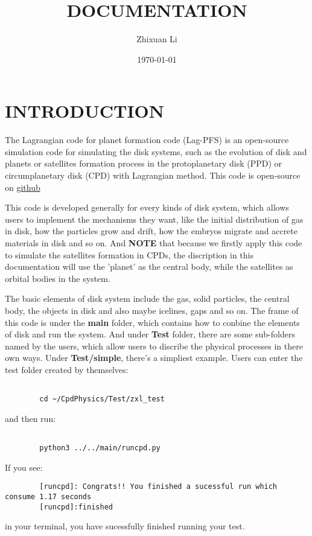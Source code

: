 \documentclass[12pt]{article}
\title{\textbf{DOCUMENTATION}}
\author{Zhixuan Li}
\date{\today}
\begin{document}
\maketitle 

\section{INTRODUCTION}
The Lagrangian code for planet formation code (Lag-PFS) is an open-source simulation 
code for simulating the disk systems, such as the evolution of disk and  
planets or satellites formation process in the protoplanetary disk (PPD) or 
circumplanetary disk (CPD) with Lagrangian method. This code is open-source on 
\href{https://github.com/Judithlll/CpdPhysics}{github}

This code is developed generally for every kinds of disk system, which allows 
users to implement the mechanisms they want, like the initial distribution 
of gas in disk, how the particles grow and drift, how the embryos 
migrate and accrete materials in disk and so on. And \textbf{NOTE} that because 
we firstly apply this code to simulate the satellites formation in CPDs, the 
discription in this documentation will use the 'planet' as the central body, while 
the satellites as orbital bodies in the system. 

The basic elements of disk system include the gas, solid particles, the central 
body, the objects in disk and also maybe icelines, gaps and so on.
The frame of this code is under the \textbf{main} folder, which contains 
how to conbine the elements of disk and run the system. And under 
\textbf{Test} folder, there are some sub-folders named by the users, which 
allow users to discribe the physical processes in there own ways. Under 
\textbf{Test/simple}, there's a simpliest example. Users can enter the 
test folder created by themselves:
\begin{verbatim}

        cd ~/CpdPhysics/Test/zxl_test

\end{verbatim}
and then run:
\begin{verbatim}

        python3 ../../main/runcpd.py 

\end{verbatim}

If you see: 
\begin{verbatim}
        [runcpd]: Congrats!! You finished a sucessful run which consume 1.17 seconds
        [runcpd]:finished
\end{verbatim}
in your terminal, you have sucessfully finished running your test. 
\end{document}
